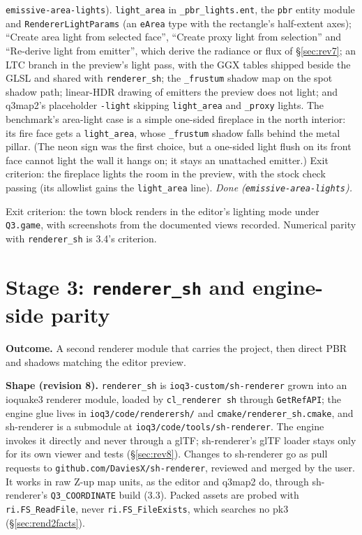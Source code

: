 \documentclass[11pt,a4paper]{article}
\begin{document}
\begin{enumerate}
  \texttt{emissive-area-lights}). \texttt{light\_area} in \texttt{\_pbr\_lights.ent}, the
  \texttt{pbr} entity module and \texttt{RendererLightParams} (an \texttt{eArea} type with the
  rectangle's half-extent axes); ``Create area light from selected face'', ``Create proxy light from
  selection'' and ``Re-derive light from emitter'', which derive the radiance or flux of
  §\ref{sec:rev7}; an LTC branch in the preview's light pass, with the GGX tables shipped beside the
  GLSL and shared with \texttt{renderer\_sh}; the \texttt{\_frustum} shadow map on the spot shadow
  path; linear-HDR drawing of emitters the preview does not light; and q3map2's placeholder
  \texttt{-light} skipping \texttt{light\_area} and \texttt{\_proxy} lights. The benchmark's area-light
  case is a simple one-sided fireplace in the north interior: its fire face gets a
  \texttt{light\_area}, whose \texttt{\_frustum} shadow falls behind the metal pillar. (The neon
  sign was the first choice, but a one-sided light flush on its front face cannot light the wall it
  hangs on; it stays an unattached emitter.) Exit criterion: the fireplace lights the room in the
  preview, with the stock check passing (its allowlist gains the \texttt{light\_area} line). \emph{Done (\texttt{emissive-area-lights}).}
\end{enumerate}
Exit criterion: the town block renders in the editor's lighting mode under \texttt{Q3.game}, with
screenshots from the documented views recorded. Numerical parity with
\texttt{renderer\_sh} is 3.4's criterion.

\section{Stage 3: \texttt{renderer\_sh} and engine-side parity}

\textbf{Outcome.} A second renderer module that carries the project, then direct PBR and shadows
matching the editor preview.

\textbf{Shape (revision 8).} \texttt{renderer\_sh} is \texttt{ioq3-custom/sh-renderer} grown into
an ioquake3 renderer module, loaded by \texttt{cl\_renderer sh} through \texttt{GetRefAPI}; the
engine glue lives in \texttt{ioq3/code/renderersh/} and \texttt{cmake/renderer\_sh.cmake}, and
sh-renderer is a submodule at \texttt{ioq3/code/tools/sh-renderer}. The engine invokes it directly
and never through a glTF; sh-renderer's glTF loader stays only for its own viewer and tests
(§\ref{sec:rev8}). Changes to
sh-renderer go as pull requests to \texttt{github.com/DaviesX/sh-renderer}, reviewed and merged by
the user. It works in raw Z-up map units, as the editor and q3map2 do, through sh-renderer's
\texttt{Q3\_COORDINATE} build (3.3). Packed assets are probed with
\texttt{ri.FS\_ReadFile}, never \texttt{ri.FS\_FileExists}, which searches no pk3
(§\ref{sec:rend2facts}).
\end{document}
